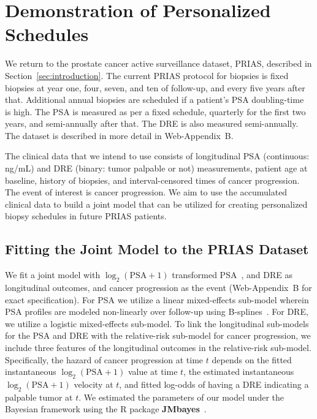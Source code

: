 \section{Demonstration of Personalized Schedules}
\label{sec:results}
We return to the prostate cancer active surveillance dataset, PRIAS, described in Section~\ref{sec:introduction}. The current PRIAS protocol for biopsies is fixed biopsies at year one, four, seven, and ten of follow-up, and every five years after that. Additional annual biopsies are scheduled if a patient's PSA doubling-time~\citep{bokhorst2015compliance} is high. The PSA is measured as per a fixed schedule, quarterly for the first two years, and semi-annually after that. The DRE is also measured semi-annually. The dataset is described in more detail in Web-Appendix~B.

The clinical data that we intend to use consists of longitudinal PSA (continuous: ng/mL) and DRE (binary: tumor palpable or not) measurements, patient age at baseline, history of biopsies, and interval-censored times of cancer progression. The event of interest is cancer progression. We aim to use the accumulated clinical data to build a joint model that can be utilized for creating personalized biopsy schedules in future PRIAS patients.

\subsection{Fitting the Joint Model to the PRIAS Dataset}
We fit a joint model with $\log_2(\mbox{PSA} + 1)$ transformed PSA~\citep{lin2000latent,pearson1994mixed}, and DRE as longitudinal outcomes, and cancer progression as the event (Web-Appendix~B for exact specification). For PSA we utilize a linear mixed-effects sub-model wherein PSA profiles are modeled non-linearly over follow-up using B-splines~\citep{de1978practical}. For DRE, we utilize a logistic mixed-effects sub-model. To link the longitudinal sub-models for the PSA and DRE with the relative-risk sub-model for cancer progression, we include three features of the longitudinal outcomes in the relative-risk sub-model. Specifically, the hazard of cancer progression at time $t$ depends on the fitted instantaneous $\log_2(\mbox{PSA} + 1)$ value at time $t$, the estimated instantaneous $\log_2(\mbox{PSA} + 1)$ velocity at $t$, and fitted log-odds of having a DRE indicating a palpable tumor at $t$. We estimated the parameters of our model under the Bayesian framework using the R package \textbf{JMbayes}~\citep{rizopoulosJMbayes}.  

